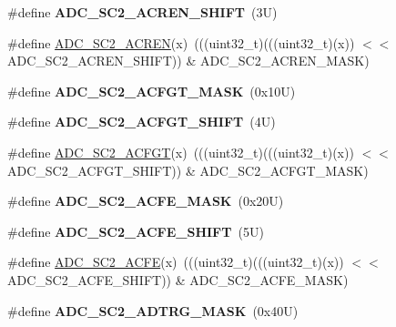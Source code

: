 \begin{DoxyCompactItemize}
\#define {\bfseries A\+D\+C\+\_\+\+S\+C2\+\_\+\+A\+C\+R\+E\+N\+\_\+\+S\+H\+I\+FT}~(3\+U)
\item 
\#define \mbox{\hyperlink{group___a_d_c___register___masks_gad7fb3f932510bfc9289e81b533ab0e3c}{A\+D\+C\+\_\+\+S\+C2\+\_\+\+A\+C\+R\+EN}}(x)~(((uint32\+\_\+t)(((uint32\+\_\+t)(x)) $<$$<$ A\+D\+C\+\_\+\+S\+C2\+\_\+\+A\+C\+R\+E\+N\+\_\+\+S\+H\+I\+FT)) \& A\+D\+C\+\_\+\+S\+C2\+\_\+\+A\+C\+R\+E\+N\+\_\+\+M\+A\+SK)
\item 
\mbox{\label{group___a_d_c___register___masks_gaf61a6fdf74bec8c24415e590dc98b572}} 
\#define {\bfseries A\+D\+C\+\_\+\+S\+C2\+\_\+\+A\+C\+F\+G\+T\+\_\+\+M\+A\+SK}~(0x10\+U)
\item 
\mbox{\label{group___a_d_c___register___masks_gaa27da559ff9959f248db75fbb95dae6b}} 
\#define {\bfseries A\+D\+C\+\_\+\+S\+C2\+\_\+\+A\+C\+F\+G\+T\+\_\+\+S\+H\+I\+FT}~(4\+U)
\item 
\#define \mbox{\hyperlink{group___a_d_c___register___masks_ga9c0a129086504b0b4a517d9ac2c48690}{A\+D\+C\+\_\+\+S\+C2\+\_\+\+A\+C\+F\+GT}}(x)~(((uint32\+\_\+t)(((uint32\+\_\+t)(x)) $<$$<$ A\+D\+C\+\_\+\+S\+C2\+\_\+\+A\+C\+F\+G\+T\+\_\+\+S\+H\+I\+FT)) \& A\+D\+C\+\_\+\+S\+C2\+\_\+\+A\+C\+F\+G\+T\+\_\+\+M\+A\+SK)
\item 
\mbox{\label{group___a_d_c___register___masks_gace8c45960f30bb960fd14d268b7eafde}} 
\#define {\bfseries A\+D\+C\+\_\+\+S\+C2\+\_\+\+A\+C\+F\+E\+\_\+\+M\+A\+SK}~(0x20\+U)
\item 
\mbox{\label{group___a_d_c___register___masks_ga195dec335492d561b06a4cc443bae019}} 
\#define {\bfseries A\+D\+C\+\_\+\+S\+C2\+\_\+\+A\+C\+F\+E\+\_\+\+S\+H\+I\+FT}~(5\+U)
\item 
\#define \mbox{\hyperlink{group___a_d_c___register___masks_gaa7694354f2e8d79359a86e4facdc1996}{A\+D\+C\+\_\+\+S\+C2\+\_\+\+A\+C\+FE}}(x)~(((uint32\+\_\+t)(((uint32\+\_\+t)(x)) $<$$<$ A\+D\+C\+\_\+\+S\+C2\+\_\+\+A\+C\+F\+E\+\_\+\+S\+H\+I\+FT)) \& A\+D\+C\+\_\+\+S\+C2\+\_\+\+A\+C\+F\+E\+\_\+\+M\+A\+SK)
\item 
\mbox{\label{group___a_d_c___register___masks_ga25669c020c8970b55cd619752bdc84d2}} 
\#define {\bfseries A\+D\+C\+\_\+\+S\+C2\+\_\+\+A\+D\+T\+R\+G\+\_\+\+M\+A\+SK}~(0x40\+U)
$$
\end{DoxyCompactItemize}
